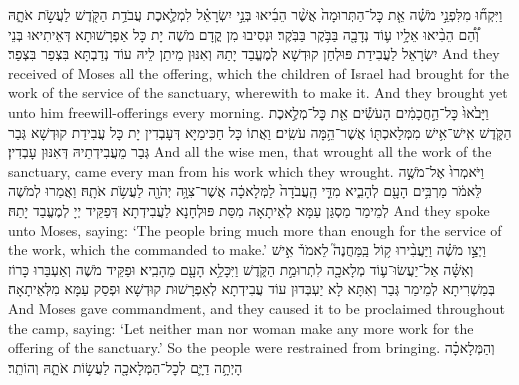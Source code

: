 {וַיִּקְח֞וּ מִלִּפְנֵ֣י מֹשֶׁ֗ה אֵ֤ת כׇּל־הַתְּרוּמָה֙ אֲשֶׁ֨ר הֵבִ֜יאוּ בְּנֵ֣י יִשְׂרָאֵ֗ל לִמְלֶ֛אכֶת עֲבֹדַ֥ת הַקֹּ֖דֶשׁ לַעֲשֹׂ֣ת אֹתָ֑הּ וְ֠הֵ֠ם הֵבִ֨יאוּ אֵלָ֥יו ע֛וֹד נְדָבָ֖ה בַּבֹּ֥קֶר בַּבֹּֽקֶר׃}
{וּנְסִיבוּ מִן קֳדָם מֹשֶׁה יָת כָּל אַפְרָשׁוּתָא דְּאֵיתִיאוּ בְּנֵי יִשְׂרָאֵל לַעֲבִידַת פּוּלְחַן קוּדְשָׁא לְמֶעֱבַד יָתַהּ וְאִנּוּן מֵיתַן לֵיהּ עוֹד נְדַבְתָּא בִּצְפַר בִּצְפַר׃}
{And they received of Moses all the offering, which the children of Israel had brought for the work of the service of the sanctuary, wherewith to make it. And they brought yet unto him freewill-offerings every morning.}{}
{וַיָּבֹ֙אוּ֙ כׇּל־הַ֣חֲכָמִ֔ים הָעֹשִׂ֕ים אֵ֖ת כׇּל־מְלֶ֣אכֶת הַקֹּ֑דֶשׁ אִֽישׁ־אִ֥ישׁ מִמְּלַאכְתּ֖וֹ אֲשֶׁר־הֵ֥מָּה עֹשִֽׂים׃}
{וַאֲתוֹ כָּל חַכִּימַיָּא דְּעָבְדִין יָת כָּל עֲבִידַת קוּדְשָׁא גְּבַר גְּבַר מֵעֲבִידְתֵיהּ דְּאִנּוּן עָבְדִין׃}
{And all the wise men, that wrought all the work of the sanctuary, came every man from his work which they wrought.}{}
{וַיֹּאמְרוּ֙ אֶל־מֹשֶׁ֣ה לֵּאמֹ֔ר מַרְבִּ֥ים הָעָ֖ם לְהָבִ֑יא מִדֵּ֤י הָֽעֲבֹדָה֙ לַמְּלָאכָ֔ה אֲשֶׁר־צִוָּ֥ה יְהֹוָ֖ה לַעֲשֹׂ֥ת אֹתָֽהּ׃
}
{וַאֲמַרוּ לְמֹשֶׁה לְמֵימַר מַסְגַּן עַמָּא לְאֵיתָאָה מִסַּת פּוּלְחָנָא לַעֲבִידְתָא דְּפַקֵּיד יְיָ לְמֶעֱבַד יָתַהּ׃}
{And they spoke unto Moses, saying: ‘The people bring much more than enough for the service of the work, which the \lord\space commanded to make.’}{}
{וַיְצַ֣ו מֹשֶׁ֗ה וַיַּעֲבִ֨ירוּ ק֥וֹל בַּֽמַּחֲנֶה֮ לֵאמֹר֒ אִ֣ישׁ וְאִשָּׁ֗ה אַל־יַעֲשׂוּ־ע֛וֹד מְלָאכָ֖ה לִתְרוּמַ֣ת הַקֹּ֑דֶשׁ וַיִּכָּלֵ֥א הָעָ֖ם מֵהָבִֽיא׃
}
{וּפַקֵּיד מֹשֶׁה וְאַעְבַּרוּ כָּרוֹז בְּמַשְׁרִיתָא לְמֵימַר גְּבַר וְאִתָּא לָא יַעְבְּדוּן עוֹד עֲבִידְתָא לְאַפְרָשׁוּת קוּדְשָׁא וּפְסַק עַמָּא מִלְּאֵיתָאָה׃}
{And Moses gave commandment, and they caused it to be proclaimed throughout the camp, saying: ‘Let neither man nor woman make any more work for the offering of the sanctuary.’ So the people were restrained from bringing.}{}
{וְהַמְּלָאכָ֗ה הָיְתָ֥ה דַיָּ֛ם לְכׇל־הַמְּלָאכָ֖ה לַעֲשׂ֣וֹת אֹתָ֑הּ וְהוֹתֵֽר׃ \setuma         
}

